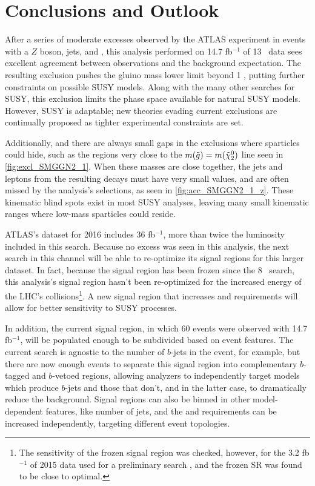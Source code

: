 
\chapter{Conclusions and Outlook} %
\label{ch:conc} 

After a series of moderate excesses observed by the \ac{ATLAS} experiment in events with a $Z$ boson, jets, and \met, this analysis performed on 14.7 fb$^{-1}$ of 13 \tev~data sees excellent agreement between observations and the background expectation. The resulting exclusion pushes the gluino mass lower limit beyond 1 \tev, putting further constraints on possible \ac{SUSY} models. Along with the many other searches for \ac{SUSY}, this exclusion limits the phase space available for natural \ac{SUSY} models. However, \ac{SUSY} is adaptable; new theories evading current exclusions are continually proposed as tighter experimental constraints are set. 

Additionally, and there are always small gaps in the exclusions where sparticles could hide, such as the regions very close to the $m({{\tilde g}}) = m(\tilde{\chi}^{0}_{2})$ line seen in \autoref{fig:excl_SMGGN2_1}. When these masses are close together, the jets and leptons from the resulting decays must have very small \pt values, and are often missed by the analysis's selections, as seen in \autoref{fig:acc_SMGGN2_1_z}. These kinematic blind spots exist in most \ac{SUSY} analyses, leaving many small kinematic ranges where low-mass sparticles could reside.

\ac{ATLAS}'s dataset for 2016 includes 36 fb$^{-1}$, more than twice the luminosity included in this search. Because no excess was seen in this analysis, the next search in this channel will be able to re-optimize its signal regions for this larger dataset. In fact, because the signal region has been frozen since the 8 \tev~search, this analysis's signal region hasn't been re-optimized for the increased energy of the \ac{LHC}'s collisions\footnote{The sensitivity of the frozen signal region was checked, however, for the 3.2 fb$^{-1}$ of 2015 data used for a preliminary search \cite{ATLAS-CONF-2015-082}, and the frozen \ac{SR} was found to be close to optimal.}. A new signal region that increases \met and \HT requirements will allow for better sensitivity to \ac{SUSY} processes. 

In addition, the current signal region, in which 60 events were observed with 14.7 fb$^{-1}$, will be populated enough to be subdivided based on event features. The current search is agnostic to the number of $b$-jets in the event, for example, but there are now enough events to separate this signal region into complementary $b$-tagged and $b$-vetoed regions, allowing analyzers to independently target models which produce $b$-jets and those that don't, and in the latter case, to dramatically reduce the \ttbar background. Signal regions can also be binned in other model-dependent features, like number of jets, and the \met and \HT requirements can be increased independently, targeting different event topologies. 

